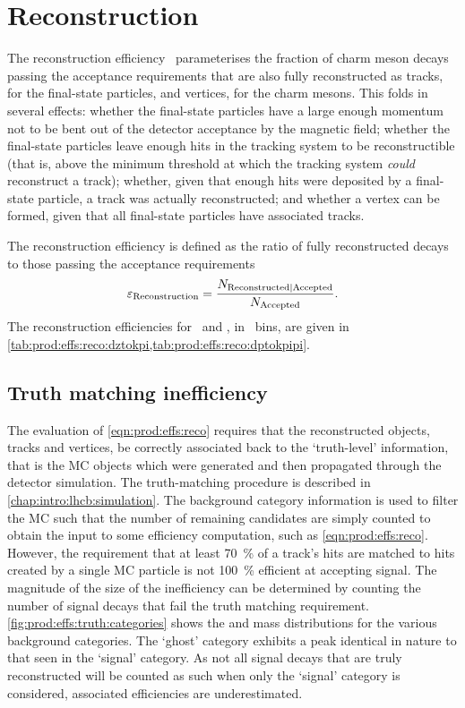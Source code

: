 \section{Reconstruction}
\label{chap:prod:effs:reco}

The reconstruction efficiency \effreco\ parameterises the fraction of charm
meson decays passing the acceptance requirements that are also fully
reconstructed as tracks, for the final-state particles, and vertices, for the
charm mesons.
This folds in several effects: whether the final-state particles have a large
enough momentum not to be bent out of the detector acceptance by the magnetic
field; whether the final-state particles leave enough hits in the tracking
system to be reconstructible (that is, above the minimum threshold at which the
tracking system \emph{could} reconstruct a track); whether, given that enough
hits were deposited by a final-state particle, a track was actually
reconstructed; and whether a vertex can be formed, given that all final-state
particles have associated tracks.

The reconstruction efficiency is defined as the ratio of fully reconstructed
decays to those passing the acceptance requirements
\begin{equation}
  \effreco = \frac{%
    N_{\text{Reconstructed}|\text{Accepted}}
  }
  {%
    N_{\text{\text{Accepted}}}
  }.
  \label{eqn:prod:effs:reco}
\end{equation}
The reconstruction efficiencies for \DzToKpi\ and \DpToKpipi, in \pTy\ bins, are
given in \cref{tab:prod:effs:reco:dztokpi,tab:prod:effs:reco:dptokpipi}.

\subsection{Truth matching inefficiency}
\label{chap:prod:effs:truth}

The evaluation of \cref{eqn:prod:effs:reco} requires that the reconstructed
objects, tracks and vertices, be correctly associated back to the `truth-level'
information, that is the \ac{MC} objects which were generated and then
propagated through the detector simulation.
The truth-matching procedure is described in \cref{chap:intro:lhcb:simulation}.
The background category information is used to filter the \ac{MC} such that the
number of remaining candidates are simply counted to obtain the input to some
efficiency computation, such as \cref{eqn:prod:effs:reco}.
However, the requirement that at least \SI{70}{\percent} of a track's hits are 
matched to hits created by a single \ac{MC} particle is not \SI{100}{\percent} 
efficient at accepting signal.
The magnitude of the size of the inefficiency can be determined by counting the
number of signal decays that fail the truth matching requirement.
\cref{fig:prod:effs:truth:categories} shows the \PDzero and \PDplus mass
distributions for the various background categories.
The `ghost' category exhibits a peak identical in nature to that seen in the
`signal' category.
As not all signal decays that are truly reconstructed will be counted as such
when only the `signal' category is considered, associated efficiencies are
underestimated.

